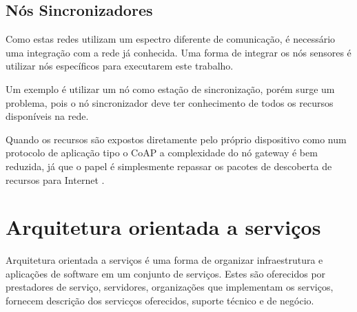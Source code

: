 \subsection{N\'os Sincronizadores}

Como estas redes utilizam um espectro diferente de comunica\c{c}\~ao, \'e necess\'ario uma integra\c{c}\~ao com a rede j\'a conhecida. Uma forma de integrar os n\'os sensores \'e utilizar n\'os espec\'ificos para executarem este trabalho.

Um exemplo \'e utilizar um n\'o como esta\c{c}\~ao de sincroniza\c{c}\~ao, por\'em surge um problema, pois o n\'o sincronizador deve ter conhecimento de todos os recursos dispon\'iveis na rede.

Quando os recursos s\~ao expostos diretamente pelo pr\'oprio dispositivo como num protocolo de aplica\c{c}\~ao tipo o CoAP a complexidade do n\'o gateway \'e bem reduzida, j\'a que o papel \'e simplesmente repassar os pacotes de descoberta de recursos para Internet \cite{Colitti11deintegrating}.


%
%

\section{Arquitetura orientada a servi\c{c}os}

Arquitetura orientada a servi\c{c}os \'e uma forma de organizar infraestrutura e aplica\c{c}\~oes de software em um conjunto de servi\c{c}os. Estes s\~ao oferecidos por prestadores de servi\c{c}o, servidores, organiza\c{c}\~oes que implementam os servi\c{c}os, fornecem descri\c{c}\~ao dos servic\c{c}os oferecidos, suporte t\'ecnico e de neg\'ocio.

